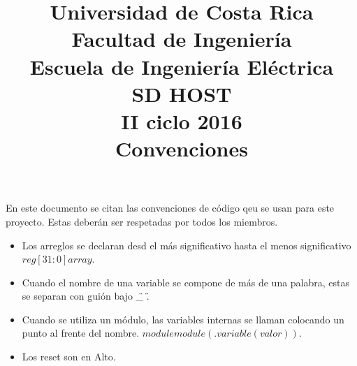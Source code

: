 

\title{Universidad de Costa Rica\\{\small Facultad de Ingeniería\\Escuela de Ingeniería
    Eléctrica\\SD HOST\\II ciclo 2016\\\vspace*{0.55in} Convenciones}}





En este documento se citan las convenciones de código qeu se usan para este proyecto. Estas deberán
ser respetadas por todos los miembros. 

\begin{itemize}
\item Los arreglos se declaran desd el más significativo hasta el menos significativo $reg [31:0] array$.
\item Cuando el nombre de una variable se compone de más de una palabra, estas se separan con guión
  bajo \"\_ \".
\item Cuando se utiliza un módulo, las variables internas se llaman colocando un punto al frente del
  nombre. $module module(.variable(valor))$. 
\item Los reset son en Alto.
\end{itemize}
\newpage


